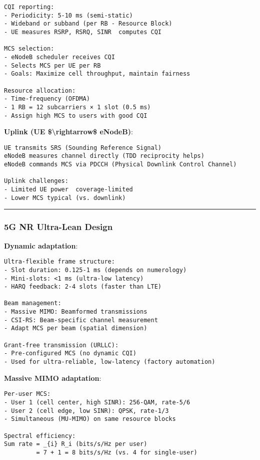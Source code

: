 \begin{verbatim}
CQI reporting:
- Periodicity: 5-10 ms (semi-static)
- Wideband or subband (per RB - Resource Block)
- UE measures RSRP, RSRQ, SINR  computes CQI

MCS selection:
- eNodeB scheduler receives CQI
- Selects MCS per UE per RB
- Goals: Maximize cell throughput, maintain fairness

Resource allocation:
- Time-frequency (OFDMA)
- 1 RB = 12 subcarriers × 1 slot (0.5 ms)
- Assign high MCS to users with good CQI
\end{verbatim}

\textbf{Uplink (UE \$\textbackslash rightarrow\$ eNodeB)}:

\begin{verbatim}
UE transmits SRS (Sounding Reference Signal)
eNodeB measures channel directly (TDD reciprocity helps)
eNodeB commands MCS via PDCCH (Physical Downlink Control Channel)

Uplink challenges:
- Limited UE power  coverage-limited
- Lower MCS typical (vs. downlink)
\end{verbatim}

\begin{center}\rule{0.5\linewidth}{0.5pt}\end{center}

\subsubsection{5G NR Ultra-Lean Design}\label{g-nr-ultra-lean-design}

\textbf{Dynamic adaptation}:

\begin{verbatim}
Ultra-flexible frame structure:
- Slot duration: 0.125-1 ms (depends on numerology)
- Mini-slots: <1 ms (ultra-low latency)
- HARQ feedback: 2-4 slots (faster than LTE)

Beam management:
- Massive MIMO: Beamformed transmissions
- CSI-RS: Beam-specific channel measurement
- Adapt MCS per beam (spatial dimension)

Grant-free transmission (URLLC):
- Pre-configured MCS (no dynamic CQI)
- Used for ultra-reliable, low-latency (factory automation)
\end{verbatim}

\textbf{Massive MIMO adaptation}:

\begin{verbatim}
Per-user MCS:
- User 1 (cell center, high SINR): 256-QAM, rate-5/6
- User 2 (cell edge, low SINR): QPSK, rate-1/3
- Simultaneous (MU-MIMO) on same resource blocks

Spectral efficiency:
Sum rate = _{i} R_i (bits/s/Hz per user)
         = 7 + 1 = 8 bits/s/Hz (vs. 4 for single-user)
\end{verbatim}

